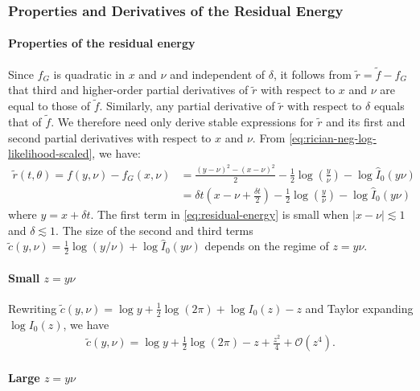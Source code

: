 \documentclass{article}
\begin{document}
\subsubsection{Properties and Derivatives of the Residual Energy}\label{sec:residual-energy-properties-and-derivatives}

\paragraph{Properties of the residual energy}

Since $f_G$ is quadratic in $x$ and $\nu$ and independent of $\delta$, it follows from $\tilde{r} = \tilde{f} - f_G$ that third and higher-order partial derivatives of $\tilde{r}$ with respect to $x$ and $\nu$ are equal to those of $\tilde{f}$.
Similarly, any partial derivative of $\tilde{r}$ with respect to $\delta$ equals that of $\tilde{f}$.
We therefore need only derive stable expressions for $\tilde{r}$ and its first and second partial derivatives with respect to $x$ and $\nu$.
From \cref{eq:rician-neg-log-likelihood-scaled}, we have:
%
\begin{align}
  \tilde{r}(t,\theta) = f(y, \nu) - f_G(x,\nu) & = \frac{(y-\nu)^2 - (x-\nu)^2}{2} - \frac{1}{2}\log\left(\frac{y}{\nu}\right) - \log \hat{I}_0(y \nu)                                               \\
                                               & = \delta t \left(x - \nu + \frac{\delta t}{2}\right) - \frac{1}{2}\log\left(\frac{y}{\nu}\right) - \log \hat{I}_0(y \nu) \label{eq:residual-energy}
\end{align}
%
where $y = x + \delta t$.
The first term in \cref{eq:residual-energy} is small when $|x-\nu| \lesssim 1$ and $\delta \lesssim 1$.
The size of the second and third terms $\tilde{c}(y,\nu) = \frac{1}{2}\log(y/\nu) + \log\hat{I}_0(y\nu)$ depends on the regime of $z=y\nu$.

\paragraph{Small $z=y\nu$}

Rewriting $\tilde{c}(y,\nu) = \log y + \frac{1}{2}\log(2\pi) + \log I_0(z) - z$ and Taylor expanding $\log I_0(z)$, we have
%
\begin{align}\label{eq:c-small-z}
  \tilde{c}(y,\nu) = \log y + \frac{1}{2}\log(2\pi) - z + \frac{z^2}{4} + \mathcal{O}(z^4).
\end{align}

\paragraph{Large $z=y\nu$}
\end{document}
